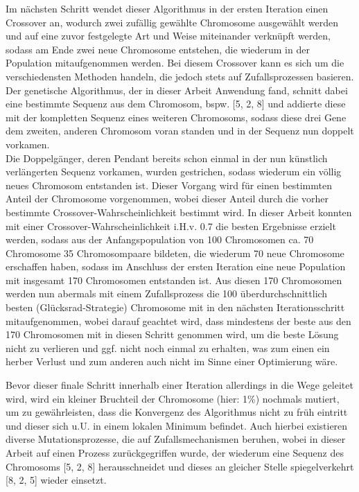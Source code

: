 \documentclass[a4paper,12pt,parskip,bibtotoc,liststotoc]{article}
\begin{document}
Im nächsten Schritt wendet dieser Algorithmus in der ersten Iteration einen Crossover an, wodurch zwei zufällig gewählte Chromosome ausgewählt werden und auf eine zuvor festgelegte Art und Weise miteinander verknüpft werden, sodass am Ende zwei neue Chromosome entstehen, die wiederum in der Population mitaufgenommen werden.
Bei diesem Crossover kann es sich um die verschiedensten Methoden handeln, die jedoch stets auf Zufallsprozessen basieren.
Der genetische Algorithmus, der in dieser Arbeit Anwendung fand, schnitt dabei eine bestimmte Sequenz aus dem Chromosom, bspw. [5, 2, 8] und addierte diese mit der kompletten Sequenz eines weiteren Chromosoms, sodass diese drei Gene dem zweiten, anderen Chromosom voran standen und in der Sequenz nun doppelt vorkamen.\\
 
Die Doppelgänger, deren Pendant bereits schon einmal in der nun künstlich verlängerten Sequenz vorkamen, wurden gestrichen, sodass wiederum ein völlig neues Chromosom entstanden ist.
Dieser Vorgang wird für einen bestimmten Anteil der Chromosome vorgenommen, wobei dieser Anteil durch die vorher bestimmte Crossover-Wahrscheinlichkeit bestimmt wird. 
In dieser Arbeit konnten mit einer Crossover-Wahrscheinlichkeit i.H.v. 0.7 die besten Ergebnisse erzielt werden, sodass aus der Anfangspopulation von 100 Chromosomen ca. 70 Chromosome 35 Chromosompaare bildeten, die wiederum 70 neue Chromosome erschaffen haben, sodass im Anschluss der ersten Iteration eine neue Population mit insgesamt 170 Chromosomen entstanden ist. 
Aus diesen 170 Chromosomen werden nun abermals mit einem Zufallsprozess die 100 überdurchschnittlich besten (Glücksrad-Strategie) Chromosome mit in den nächsten Iterationsschritt mitaufgenommen, wobei darauf geachtet wird, dass mindestens der beste aus den 170 Chromosomen mit in diesen Schritt genommen wird, um die beste Lösung nicht zu verlieren und ggf. nicht noch einmal zu erhalten, was zum einen ein herber Verlust und zum anderen auch nicht im Sinne einer Optimierung wäre.



Bevor dieser finale Schritt innerhalb einer Iteration allerdings in die Wege geleitet wird, wird ein kleiner Bruchteil der Chromosome (hier: 1\%) nochmals mutiert, um zu gewährleisten, dass die Konvergenz des Algorithmus nicht zu früh eintritt und dieser sich u.U. in einem lokalen Minimum befindet. 
Auch hierbei existieren diverse Mutationsprozesse, die auf Zufallsmechanismen beruhen, wobei in dieser Arbeit auf einen Prozess zurückgegriffen wurde, der wiederum eine Sequenz des Chromosoms [5, 2, 8] herausschneidet und dieses an gleicher Stelle spiegelverkehrt [8, 2, 5] wieder einsetzt.\\
\end{document}
